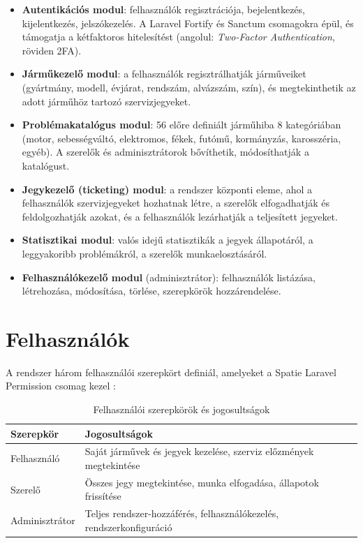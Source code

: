 \documentclass[colorlinks]{thesis-kando}
\begin{document}
\begin{itemize}
\item \textbf{Autentikációs modul}: felhasználók regisztrációja, bejelentkezés, kijelentkezés, jelszókezelés. A Laravel Fortify és Sanctum csomagokra épül, és támogatja a kétfaktoros hitelesítést (angolul: \emph{Two-Factor Authentication}, röviden 2FA).
\item \textbf{Járműkezelő modul}: a felhasználók regisztrálhatják járműveiket (gyártmány, modell, évjárat, rendszám, alvázszám, szín), és megtekinthetik az adott járműhöz tartozó szervizjegyeket.
\item \textbf{Problémakatalógus modul}: 56 előre definiált járműhiba 8 kategóriában (motor, sebességváltó, elektromos, fékek, futómű, kormányzás, karosszéria, egyéb). A szerelők és adminisztrátorok bővíthetik, módosíthatják a katalógust.
\item \textbf{Jegykezelő (ticketing) modul}: a rendszer központi eleme, ahol a felhasználók szervizjegyeket hozhatnak létre, a szerelők elfogadhatják és feldolgozhatják azokat, és a felhasználók lezárhatják a teljesített jegyeket.
\item \textbf{Statisztikai modul}: valós idejű statisztikák a jegyek állapotáról, a leggyakoribb problémákról, a szerelők munkaelosztásáról.
\item \textbf{Felhasználókezelő modul} (adminisztrátor): felhasználók listázása, létrehozása, módosítása, törlése, szerepkörök hozzárendelése.
\end{itemize}

\section{Felhasználók}

A rendszer három felhasználói szerepkört definiál, amelyeket a Spatie Laravel Permission csomag kezel \cite{ref15}:

\begin{table}[ht]
	\centering
	\begin{tabular}{ll}
		\hline
		\textbf{Szerepkör} & \textbf{Jogosultságok} \\ \hline
		Felhasználó & Saját járművek és jegyek kezelése, szerviz előzmények megtekintése \\
		Szerelő & Összes jegy megtekintése, munka elfogadása, állapotok frissítése \\
		Adminisztrátor & Teljes rendszer-hozzáférés, felhasználókezelés, rendszerkonfiguráció \\ \hline
	\end{tabular}
	\caption{Felhasználói szerepkörök és jogosultságok}
	\label{tab-roles}
\end{table}
\end{document}
